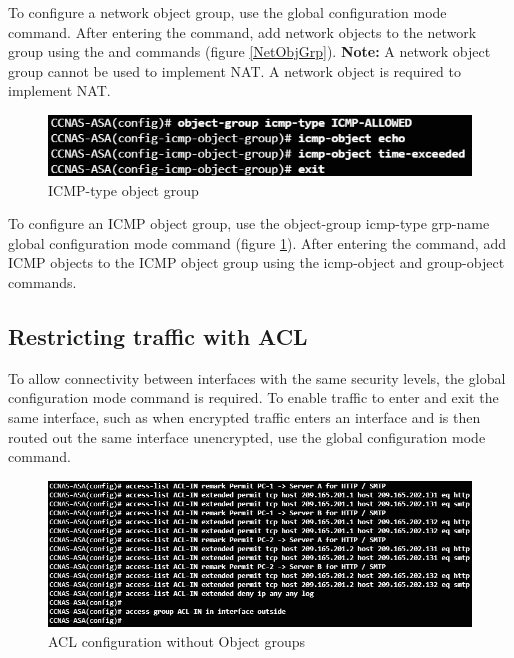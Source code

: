 To configure a network object group, use the  global configuration mode command. After entering the command, add network objects to the network group using the  and  commands (figure \ref{NetObjGrp}). \textbf{Note:} A network object group cannot be used to implement NAT. A network object is required to implement NAT.\\

\begin{figure}[hbtp]
\caption{ICMP-type object group}\label{ICMPobjgrp}
\centering
\includegraphics[scale=0.5]{pictures/ICMPobjgrp.PNG}
\end{figure}


To configure an ICMP object group, use the object-group icmp-type grp-name global configuration mode command (figure \ref{ICMPobjgrp}). After entering the command, add ICMP objects to the ICMP object group using the icmp-object and group-object commands.\\

\subsection{Restricting traffic with ACL}

To allow connectivity between interfaces with the same security levels, the  global configuration mode command is required. To enable traffic to enter and exit the same interface, such as when encrypted traffic enters an interface and is then routed out the same interface unencrypted, use the  global configuration mode command.\\

\begin{figure}[hbtp]
\caption{ACL configuration without Object groups}\label{withoutObj}
\centering
\includegraphics[scale=0.7]{pictures/withoutObj.PNG}
\end{figure}

